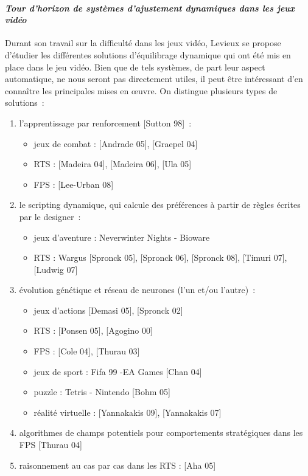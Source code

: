	\paragraph{\emph{Tour d'horizon de systèmes d'ajustement dynamiques dans les jeux vidéo}	 \\ \quad}
Durant son travail sur la difficulté dans les jeux vidéo, Levieux se propose d'étudier les différentes solutions d’équilibrage dynamique qui ont été mis en place dans le jeu vidéo. Bien que de tels systèmes, de part leur aspect automatique, ne nous seront pas directement utiles, il peut être intéressant d'en connaître les principales mises en œuvre. On distingue plusieurs types de solutions~: 
\begin{enumerate}
	\item l’apprentissage par renforcement [Sutton 98]~:
	\begin{itemize}
		\item jeux de combat : [Andrade 05], [Graepel 04]
		\item RTS : [Madeira 04], [Madeira 06], [Ula 05]
		\item FPS : [Lee-Urban 08]
	\end{itemize}
	\item le scripting dynamique, qui calcule des préférences à partir de règles écrites par le designer~:
	\begin{itemize}
		\item jeux d’aventure : Neverwinter Nights - Bioware
		\item RTS : Wargus [Spronck 05], [Spronck 06], [Spronck 08], [Timuri 07], [Ludwig 07]
	\end{itemize}
		\item évolution génétique et réseau de neurones (l’un et/ou l’autre)~:
	\begin{itemize}
		\item jeux d’actions [Demasi 05], [Spronck 02]
		\item RTS : [Ponsen 05], [Agogino 00]
		\item FPS : [Cole 04], [Thurau 03]
		\item jeux de sport : Fifa 99 -EA Games [Chan 04]
		\item puzzle : Tetris - Nintendo [Bohm 05]
		\item réalité virtuelle : [Yannakakis 09], [Yannakakis 07]
	\end{itemize}
		\item algorithmes de champs potentiels pour comportements stratégiques dans les FPS [Thurau 04]
		\item raisonnement au cas par cas dans les RTS : [Aha 05]
\end{enumerate}

